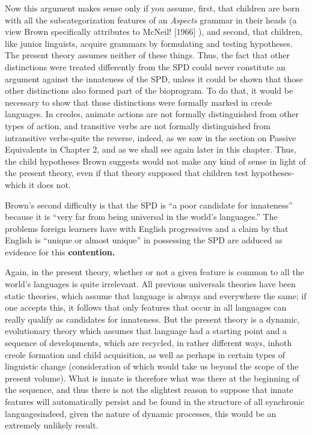 Now this argument makes sense only if you assume, first, that
% 
children are born with all the subcategorization features of an \textit{Aspects} grammar in their heads (a view Brown specifically attributes to McNeil! [1966] ), and second, that children, like junior linguists, acquire gram\-mars by formulating and testing hypotheses. The present theory as\-sumes neither of these things. Thus, the fact that other distinctions were treated differently from the SPD could never constitute an argu\-ment against the innateness of the SPD, unless it could be shown that those other distinctions also formed part of the bioprogram. To do that, it would be necessary to show that those distinctions were for\-mally marked in creole languages. In creoles, animate actions are not formally distinguished from other types of action, and transitive verbs are not formally distinguished from intransitive verbs-quite the reverse, indeed, as we saw in the section on Passive Equivalents in Chapter 2, and as we shall see again later in this chapter. Thus, the child hy\-potheses Brown suggests would not make any kind of sense in light of the present theory, even if that theory supposed that children test hypotheses-which it does not.

Brown's second difficulty is that the SPD is ``a poor candidate
for innateness'' because it is ``very far from being universal in the world's languages.'' The problems foreign learners have with English progressives and a claim by \citet{Joos1964} that English is ``unique or almost unique'' in possessing the SPD are adduced as evidence for this \textbf{contention.}

Again, in the present theory, whether or not a given feature is common to all the world's languages is quite irrelevant. All previous universals theories have been static theories, which assume that lan\-guage is always and everywhere the same; if one accepts this, it follows that only features that occur in all languages can really qualify as can\-didates for innateness. But the present theory is a dynamic, evolu\-tionary theory which assumes that language had a starting point and a sequence of developments, which are recycled, in rather different ways, inhoth creole formation and child acquisition, as well as perhaps in certain types of linguistic change (consideration of which would take us beyond the scope of the present volume). What is innate is therefore
what was there at the beginning of the sequence, and thus there is not the slightest reason to suppose that innate features will automati\-cally persist and be found in the structure of all synchronic languages\-indeed, given the nature of dynamic processes, this would be an ex\-tremely unlikely result.

